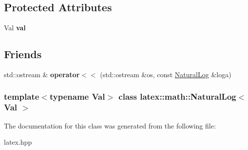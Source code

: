 \subsection*{\-Protected \-Attributes}
\begin{DoxyCompactItemize}
\item 
\hypertarget{classlatex_1_1math_1_1NaturalLog_a46cee76970936d26daf87e8c3ec4c47b}{\-Val {\bfseries val}}\label{classlatex_1_1math_1_1NaturalLog_a46cee76970936d26daf87e8c3ec4c47b}

\end{DoxyCompactItemize}
\subsection*{\-Friends}
\begin{DoxyCompactItemize}
\item 
\hypertarget{classlatex_1_1math_1_1NaturalLog_a5151466531baf2bea2fc1928e34cb084}{std\-::ostream \& {\bfseries operator$<$$<$} (std\-::ostream \&os, const \hyperlink{classlatex_1_1math_1_1NaturalLog}{\-Natural\-Log} \&loga)}\label{classlatex_1_1math_1_1NaturalLog_a5151466531baf2bea2fc1928e34cb084}

\end{DoxyCompactItemize}
\subsubsection*{template$<$typename \-Val$>$ class latex\-::math\-::\-Natural\-Log$<$ Val $>$}



\-The documentation for this class was generated from the following file\-:\begin{DoxyCompactItemize}
\item 
latex.\-hpp\end{DoxyCompactItemize}
